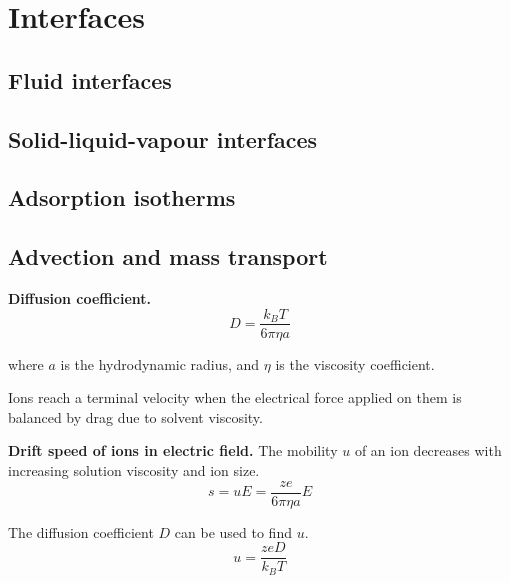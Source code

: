 \section{Interfaces}

\subsection*{Fluid interfaces} %

\subsection*{Solid-liquid-vapour interfaces}

\subsection*{Adsorption isotherms}

\subsection*{Advection and mass transport}

\textbf{Diffusion coefficient.} $$D = \frac{k_B T}{6 \pi \eta a}$$

where $a$ is the hydrodynamic radius, and $\eta$ is the viscosity coefficient.

Ions reach a terminal velocity when the electrical force applied on them is balanced
by drag due to solvent viscosity.
\vspace{\baselineskip}

\textbf{Drift speed of ions in electric field.} The mobility $u$ of an ion decreases with increasing solution viscosity and ion size. $$s = uE = \frac{ze}{6 \pi \eta a} E$$

The diffusion coefficient $D$ can be used to find $u$.
\begin{equation*}
    u = \frac{zeD}{k_B T}
\end{equation*}

